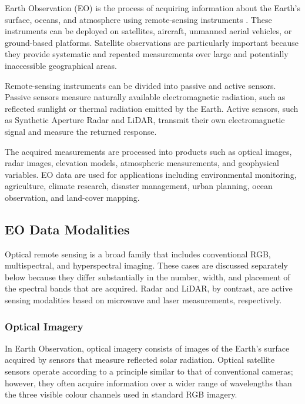 \documentclass[11pt,a4paper]{article}
\begin{document}
Earth Observation (EO) is the process of acquiring information about
the Earth's surface, oceans, and atmosphere using remote-sensing
instruments \cite{esa_earth_observation}. These instruments can be
deployed on satellites, aircraft, unmanned aerial vehicles, or
ground-based platforms. Satellite observations are particularly
important because they provide systematic and repeated measurements
over large and potentially inaccessible geographical areas.

Remote-sensing instruments can be divided into passive and active
sensors. Passive sensors measure naturally available electromagnetic
radiation, such as reflected sunlight or thermal radiation emitted by
the Earth. Active sensors, such as Synthetic Aperture Radar and LiDAR,
transmit their own electromagnetic signal and measure the returned
response.

The acquired measurements are processed into products such as optical
images, radar images, elevation models, atmospheric measurements, and
geophysical variables. EO data are used for applications including
environmental monitoring, agriculture, climate research, disaster
management, urban planning, ocean observation, and land-cover mapping.

\subsection{EO Data Modalities}

Optical remote sensing is a broad family that includes conventional RGB,
multispectral, and hyperspectral imaging. These cases are discussed
separately below because they differ substantially in the number, width,
and placement of the spectral bands that are acquired. Radar and LiDAR,
by contrast, are active sensing modalities based on microwave and laser
measurements, respectively.

\subsubsection{Optical Imagery}

In Earth Observation, optical imagery consists of images of the Earth's
surface acquired by sensors that measure reflected solar radiation.
Optical satellite sensors operate according to a principle similar to
that of conventional cameras; however, they often acquire information
over a wider range of wavelengths than the three visible colour channels
used in standard RGB imagery.
\end{document}
